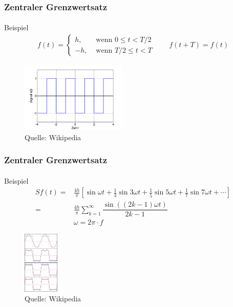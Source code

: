 \documentclass{beamer}
\begin{document}
\begin{frame}
    \frametitle{Zentraler Grenzwertsatz}
\framesubtitle{}

\begin{block}{Beispiel}
\begin{align*}
f(t) = \begin{cases} h, & \mbox{ wenn } 0\leq  t <T/2 \\ -h, & \mbox{ wenn } T/2 \leq t < T \end{cases}  \qquad f(t + T) = f(t)
\end{align*}
\end{block}
\begin{figure}[htp]
      \centering
    \includegraphics[width=0.45\textwidth]{img/rechteck}
      \caption{Quelle: Wikipedia}
\end{figure}

 \end{frame}

\begin{frame}
    \frametitle{Zentraler Grenzwertsatz}
\framesubtitle{}

\begin{block}{Beispiel}
\begin{align*}
Sf(t)=& \tfrac{4h}{\pi}\left[\sin \omega t+\tfrac{1}{3}\sin3 \omega t+\tfrac {1}{5}\sin5 \omega t+\tfrac{1}{7}\sin7 \omega t+ \cdots\right]\\
=& \tfrac{4h}{\pi} \sum_{k=1}^\infty \dfrac{ \sin\left( (2k-1)\omega t \right) }{2k-1} \\
& \omega = 2 \pi \cdot f
\end{align*}
\end{block}
\begin{figure}[htp]
      \centering
    \includegraphics[width=0.15\textwidth]{img/fourier_example}
      \caption{Quelle: Wikipedia}
\end{figure}

 \end{frame}
\end{document}
